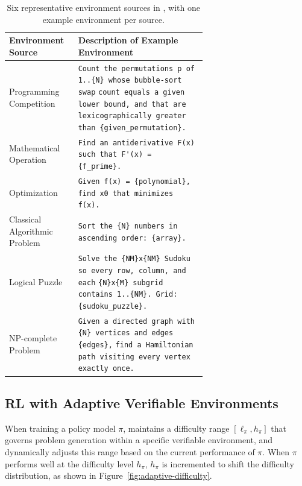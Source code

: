 \documentclass{article}
\theoremstyle{plain}
\theoremstyle{definition}
\theoremstyle{remark}
\begin{document}
\begin{table}[t]
\caption{Six representative environment sources in \suite{}, with one example environment per source.
}
\vskip -0.15in
\label{tab:example-environments}
\begin{center}
\begin{small}
\begin{sc}
\begin{tabular}{lp{0.65\linewidth}}
\toprule
Environment Source & Description of Example Environment \\
\midrule
Programming Competition &
\verb|Count the permutations p of 1..{N} whose bubble-sort swap| \newline
\verb|count equals a given lower bound, and that are| \newline
\verb|lexicographically greater than {given_permutation}.| \\[2pt]

Mathematical Operation &
\verb|Find an antiderivative F(x) such that F'(x) = {f_prime}.| \\[2pt]

Optimization &
\verb|Given f(x) = {polynomial}, find x0 that minimizes f(x).| \\[2pt]

Classical Algorithmic Problem &
\verb|Sort the {N} numbers in ascending order: {array}.| \\[2pt]

Logical Puzzle &
\verb|Solve the {NM}x{NM} Sudoku so every row, column, and each| \newline
\verb|{N}x{M} subgrid contains 1..{NM}. Grid: {sudoku_puzzle}.| \\[2pt]

NP-complete Problem &
\verb|Given a directed graph with {N} vertices and edges {edges},| \newline
\verb|find a Hamiltonian path visiting every vertex exactly once.| \\
\bottomrule
\end{tabular}
\end{sc}
\end{small}
\end{center}
\vskip -0.2in
\end{table}

\subsection{RL with Adaptive Verifiable Environments}
\label{sec:algorithm}
When training a policy model $\pi$, \ours{} maintains a difficulty range $[\ell_\pi, h_\pi]$ that governs problem generation within a specific verifiable environment, and dynamically adjusts this range based on the current performance of $\pi$.
When $\pi$ performs well at the difficulty level $h_\pi$, $h_\pi$ is incremented to shift the difficulty distribution, as shown in Figure~\ref{fig:adaptive-difficulty}.
\end{document}
